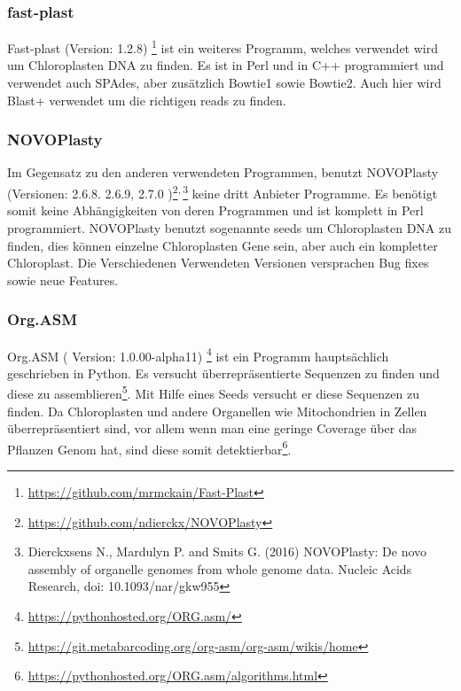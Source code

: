 \documentclass{scrartcl}
\begin{document}
\subsubsection{fast-plast}
\label{sec-2-5-2}
Fast-plast  (Version: 1.2.8) \footnote{\url{https://github.com/mrmckain/Fast-Plast}} ist ein weiteres Programm, welches verwendet wird um Chloroplasten DNA zu finden. Es ist in Perl und in C++ programmiert und verwendet auch SPAdes, 
aber zusätzlich Bowtie1 sowie Bowtie2. Auch hier wird Blast+ verwendet um die richtigen reads zu finden. 
\subsubsection{NOVOPlasty}
\label{sec-2-5-3}
Im Gegensatz zu den anderen verwendeten Programmen, benutzt NOVOPlasty (Versionen: 2.6.8. 2.6.9, 2.7.0 )\footnote{\url{https://github.com/ndierckx/NOVOPlasty}}\textsuperscript{,}\,\footnote{Dierckxsens N., Mardulyn P. and Smits G. (2016) NOVOPlasty: De novo assembly of organelle genomes from whole genome data. Nucleic Acids Research, doi: 10.1093/nar/gkw955} keine dritt Anbieter Programme. Es benötigt somit keine Abhängigkeiten von deren Programmen
und ist komplett in Perl programmiert. NOVOPlasty benutzt sogenannte seeds um Chloroplasten DNA zu finden, dies können einzelne Chloroplasten Gene sein, aber auch ein kompletter Chloroplast.
Die Verschiedenen Verwendeten Versionen versprachen Bug fixes sowie neue Features. 
\subsubsection{Org.ASM}
\label{sec-2-5-4}
Org.ASM ( Version: 1.0.00-alpha11) \footnote{\url{https://pythonhosted.org/ORG.asm/}} ist ein Programm hauptsächlich geschrieben in Python. Es versucht überrepräsentierte Sequenzen zu finden und diese zu assemblieren\footnote{\url{https://git.metabarcoding.org/org-asm/org-asm/wikis/home}}. 
Mit Hilfe eines Seeds versucht er diese Sequenzen zu finden. Da Chloroplasten und andere Organellen wie Mitochondrien in Zellen überrepräsentiert sind, vor allem
wenn man eine geringe Coverage über das Pflanzen Genom hat, sind diese somit detektierbar\footnote{\url{https://pythonhosted.org/ORG.asm/algorithms.html}}.
\end{document}
